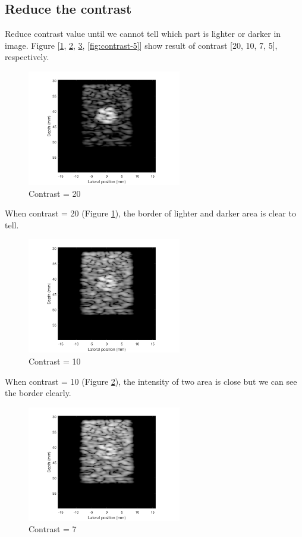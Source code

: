 \documentclass{article}
\begin{document}
\subsection{Reduce the contrast}
Reduce contrast value until we cannot tell which part is lighter or darker in image. Figure 
[\ref{fig:contrast-20}, \ref{fig:contrast-10}, \ref{fig:contrast-7}, \ref{fig:contrast-5}] show result of contrast [20, 10, 7, 5], respectively.
\begin{figure}[H]
	\centering
	\includegraphics[width = 0.6\textwidth]{src/contrast_20.pdf}
	\caption{Contrast = 20}
	\label{fig:contrast-20}
\end{figure}
When contrast = 20 (Figure \ref{fig:contrast-20}), the border of lighter and darker area is clear to tell.
\begin{figure}[H]
	\centering
	\includegraphics[width = 0.6\textwidth]{src/contrast_10.pdf}
	\caption{Contrast = 10}
	\label{fig:contrast-10}
\end{figure}
When contrast = 10 (Figure \ref{fig:contrast-10}), the intensity of two area is close but we can see the border clearly.
\begin{figure}[H]
	\centering
	\includegraphics[width = 0.6\textwidth]{src/contrast_7.pdf}
	\caption{Contrast = 7}
	\label{fig:contrast-7}
\end{figure}
\end{document}
